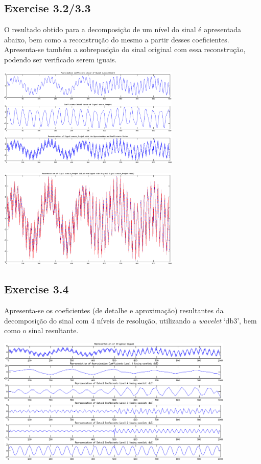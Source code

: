 \documentclass[a4paper]{article}
\begin{document}
\subsection{Exercise 3.2/3.3}
\indent \indent O resultado obtido para a decomposição de um nível do sinal é apresentada abaixo, bem como a reconstrução do mesmo a partir desses coeficientes. Apresenta-se também a sobreposição do sinal original com essa reconstrução, podendo ser verificado serem iguais.
\begin{center}
	\includegraphics[width=0.65\textwidth]{images/ex_3_2-3.png}
\end{center}
\begin{center}
	\includegraphics[width=0.65\textwidth]{images/ex_3_3_ep.png}
\end{center}

\subsection{Exercise 3.4}
\indent \indent Apresenta-se os coeficientes (de detalhe e aproximação) resultantes da decomposição do sinal com 4 níveis de resolução, utilizando a \emph{wavelet} `db3', bem como o sinal resultante.
\begin{center}
	\includegraphics[width=0.85\textwidth]{images/ex_3_4_coeffs.png}
\end{center}
\end{document}
